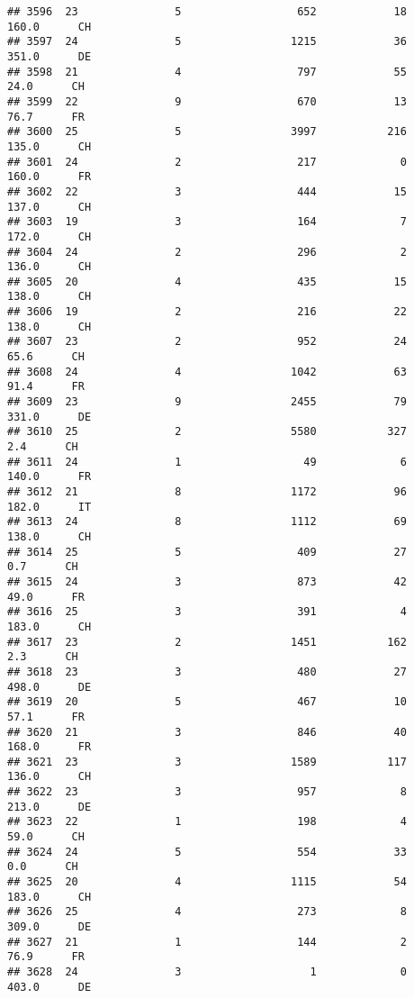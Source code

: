 \documentclass[
]{article}
\begin{document}
\begin{verbatim}
## 3596  23               5                  652            18    160.0      CH
## 3597  24               5                 1215            36    351.0      DE
## 3598  21               4                  797            55     24.0      CH
## 3599  22               9                  670            13     76.7      FR
## 3600  25               5                 3997           216    135.0      CH
## 3601  24               2                  217             0    160.0      FR
## 3602  22               3                  444            15    137.0      CH
## 3603  19               3                  164             7    172.0      CH
## 3604  24               2                  296             2    136.0      CH
## 3605  20               4                  435            15    138.0      CH
## 3606  19               2                  216            22    138.0      CH
## 3607  23               2                  952            24     65.6      CH
## 3608  24               4                 1042            63     91.4      FR
## 3609  23               9                 2455            79    331.0      DE
## 3610  25               2                 5580           327      2.4      CH
## 3611  24               1                   49             6    140.0      FR
## 3612  21               8                 1172            96    182.0      IT
## 3613  24               8                 1112            69    138.0      CH
## 3614  25               5                  409            27      0.7      CH
## 3615  24               3                  873            42     49.0      FR
## 3616  25               3                  391             4    183.0      CH
## 3617  23               2                 1451           162      2.3      CH
## 3618  23               3                  480            27    498.0      DE
## 3619  20               5                  467            10     57.1      FR
## 3620  21               3                  846            40    168.0      FR
## 3621  23               3                 1589           117    136.0      CH
## 3622  23               3                  957             8    213.0      DE
## 3623  22               1                  198             4     59.0      CH
## 3624  24               5                  554            33      0.0      CH
## 3625  20               4                 1115            54    183.0      CH
## 3626  25               4                  273             8    309.0      DE
## 3627  21               1                  144             2     76.9      FR
## 3628  24               3                    1             0    403.0      DE

\end{verbatim}
\end{document}
